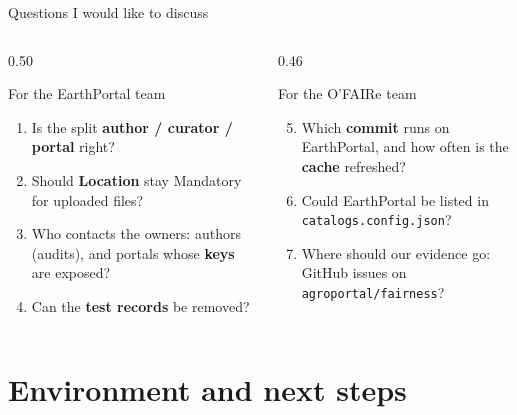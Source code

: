 \documentclass[aspectratio=169,10pt]{beamer}
\newcommand{\code}[1]{{\color{dtblue}\texttt{#1}}}
\begin{document}
\begin{frame}{Questions I would like to discuss}
  \begin{columns}[T]
    \begin{column}{0.50\textwidth}
      \begin{block}{For the EarthPortal team}
        \small
        \begin{enumerate}
          \item Is the split \textbf{author / curator / portal} right?
          \item Should \textbf{Location} stay Mandatory for uploaded files?
          \item Who contacts the owners: authors (audits), and portals whose \textbf{keys} are exposed?
          \item Can the \textbf{test records} be removed?
        \end{enumerate}
      \end{block}
    \end{column}
    \begin{column}{0.46\textwidth}
      \begin{block}{For the O'FAIRe team}
        \small
        \begin{enumerate}
          \setcounter{enumi}{4}
          \item Which \textbf{commit} runs on EarthPortal, and how often is the \textbf{cache} refreshed?
          \item Could EarthPortal be listed in \code{catalogs.config.json}?
          \item Where should our evidence go: GitHub issues on \code{agroportal/fairness}?
        \end{enumerate}
      \end{block}
    \end{column}
  \end{columns}
\end{frame}

\section{Environment and next steps}
\end{document}
